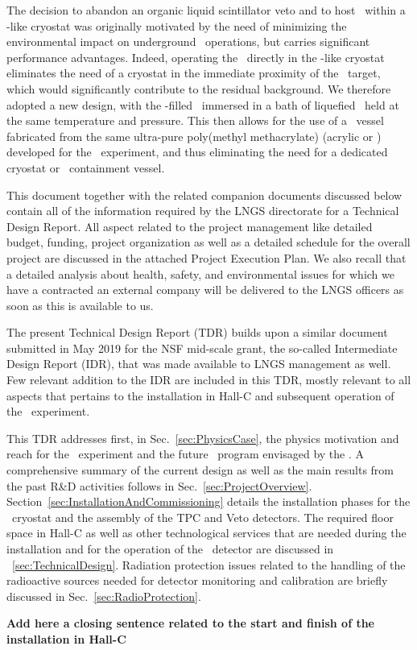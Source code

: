 The decision to abandon an organic liquid scintillator veto and to host \DSks\ within a \pDUNE-like cryostat was originally motivated by the need of minimizing the environmental impact on underground \LNGS\ operations, but carries significant performance advantages.  Indeed, operating the \TPC\ directly in the \pDUNE-like cryostat eliminates the need of a cryostat in the immediate proximity of the \UAr\ target, which would significantly contribute to the residual background.  We therefore adopted a new design, with the \UAr-filled \TPC\  immersed in a bath of liquefied \AAr\ held at the same temperature and pressure.  This then allows for the use of a \TPC\ vessel fabricated from the same ultra-pure poly(methyl methacrylate) (acrylic or \PMMA) developed for the \DEAP\ experiment, and thus eliminating the need for a dedicated cryostat or \UAr\ containment vessel. 


This document together with the related companion documents discussed below contain all of the information required by the LNGS directorate for a Technical Design Report.
All aspect related to the project management like detailed budget, funding, project organization as well as a detailed schedule for the overall project are discussed in the attached Project Execution Plan. We also recall that a detailed analysis about health, safety, and environmental issues for which we have a contracted an external company will be delivered to the LNGS officers as soon as this is available to us.

The present Technical Design Report (TDR) builds upon a similar document submitted in May 2019 for the NSF mid-scale grant, the so-called Intermediate Design Report (IDR), that was made available to LNGS management as well. Few relevant addition to the IDR are included in this TDR, mostly relevant to all aspects that pertains to the installation in Hall-C and subsequent operation of the \DSks\ experiment.

This TDR addresses first, in Sec.~\ref{sec:PhysicsCase}, the physics motivation and reach for the \DSks\ experiment and the future \LAr\ program envisaged by the \GADMC.  A comprehensive summary of the current design as well as the main results from the past R\&D activities follows in Sec.~\ref{sec:ProjectOverview}. Section~\ref{sec:InstallationAndCommissioning} details the installation phases for the \AAr\ cryostat and the assembly of the TPC and Veto detectors. The required floor space in Hall-C as well as other technological services that are needed during the installation and for the operation of the \DSks\ detector are discussed in ~\ref{sec:TechnicalDesign}. Radiation protection issues related to the handling of the radioactive sources needed for detector monitoring and calibration are briefly discussed in Sec.~\ref{sec:RadioProtection}. 

{\bf Add here a closing sentence related to the start and finish of the installation in Hall-C}

